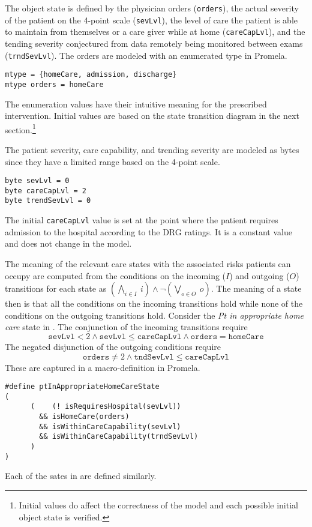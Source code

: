 The object state is defined by the physician orders (\texttt{orders}), the actual severity of the patient on the 4-point scale (\texttt{sevLvl}), the level of care the patient is able to maintain from themselves or a care giver while at home (\texttt{careCapLvl}), and the tending severity conjectured from data remotely being monitored between exams (\texttt{trndSevLvl}). The orders are modeled with an enumerated type in Promela.
%
{\small
\begin{lstlisting}[style=myPromela]
mtype = {homeCare, admission, discharge}
mtype orders = homeCare
\end{lstlisting}
}
%
\noindent The enumeration values have their intuitive meaning for the prescribed intervention. Initial values are based on the state transition diagram in the next section.\footnote{Initial values do affect the correctness of the model and each possible initial object state is verified.}

The patient severity, care capability, and trending severity are modeled as bytes since they have a limited range based on the 4-point scale.
%
{\small
\begin{lstlisting}[style=myPromela]
byte sevLvl = 0
byte careCapLvl = 2
byte trendSevLvl = 0
\end{lstlisting}
}
%
\noindent The initial \texttt{careCapLvl} value is set at the point where the patient requires admission to the hospital according to the DRG ratings. It is a constant value and does not change in the model.

The meaning of the relevant care states with the associated risks patients can occupy are computed from the conditions on the incoming ($I$) and outgoing ($O$) transitions for each state as $(\bigwedge_{i \in I}\ i) \wedge \neg(\bigvee_{o \in O}\ o)$. The meaning of a state then is that all the conditions on the incoming transitions hold while none of the conditions on the outgoing transitions hold. Consider the \emph{Pt in appropriate home care} state in . The conjunction of the incoming transitions require
%
\[
  \mathtt{sevLvl} < 2 \wedge \mathtt{sevLvl} \le \mathtt{careCapLvl} \wedge \mathtt{orders} = \mathtt{homeCare}
\]
%
The negated disjunction of the outgoing conditions require
%
\[
  \mathtt{orders} \neq 2 \wedge \mathtt{tndSevLvl} \le \mathtt{careCapLvl}
\]
%
\noindent These are captured in a macro-definition in Promela.
%
{\small
\begin{lstlisting}[style=myPromela]
#define ptInAppropriateHomeCareState
(
      (    (! isRequiresHospital(sevLvl))
        && isHomeCare(orders)                                      
        && isWithinCareCapability(sevLvl)
        && isWithinCareCapability(trndSevLvl)
      )
)
\end{lstlisting}
}
%
\noindent Each of the sates in  are defined similarly.

